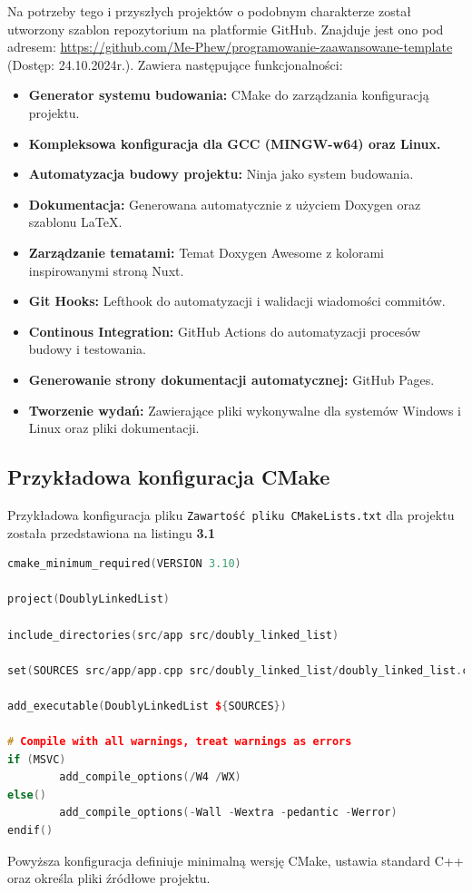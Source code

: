 Na potrzeby tego i przyszłych projektów o podobnym charakterze
został utworzony szablon repozytorium na platformie GitHub.
Znajduje jest ono pod adresem: \url{https://github.com/Me-Phew/programowanie-zaawansowane-template}\cite{GitHubProjectTemplate} (Dostęp: 24.10.2024r.).
Zawiera następujące funkcjonalności:

\begin{itemize}
  \item \textbf{Generator systemu budowania:} CMake do zarządzania konfiguracją projektu.
  \item \textbf{Kompleksowa konfiguracja dla GCC (MINGW-w64) oraz Linux.}
  \item \textbf{Automatyzacja budowy projektu:} Ninja jako system budowania.
  \item \textbf{Dokumentacja:} Generowana automatycznie z użyciem Doxygen oraz szablonu LaTeX.
  \item \textbf{Zarządzanie tematami:} Temat Doxygen Awesome z kolorami inspirowanymi stroną Nuxt.
  \item \textbf{Git Hooks:} Lefthook do automatyzacji i walidacji wiadomości commitów.
  \item \textbf{Continous Integration:} GitHub Actions do automatyzacji procesów budowy i testowania.
  \item \textbf{Generowanie strony dokumentacji automatycznej:} GitHub Pages.
  \item \textbf{Tworzenie wydań:} Zawierające pliki wykonywalne dla systemów Windows i Linux oraz pliki dokumentacji.
\end{itemize}

\newpage

\subsection{Przykładowa konfiguracja CMake}

Przykładowa konfiguracja pliku \texttt{Zawartość pliku CMakeLists.txt} dla projektu została przedstawiona
na listingu \textbf{3.1}

\begin{lstlisting}[caption=CMakeLists.txt, label={lst:listing-CMakeLists.txt}, language=C++]
cmake_minimum_required(VERSION 3.10)

project(DoublyLinkedList)

include_directories(src/app src/doubly_linked_list)

set(SOURCES src/app/app.cpp src/doubly_linked_list/doubly_linked_list.cpp src/main.cpp)

add_executable(DoublyLinkedList ${SOURCES})

# Compile with all warnings, treat warnings as errors
if (MSVC)
		add_compile_options(/W4 /WX)
else()
		add_compile_options(-Wall -Wextra -pedantic -Werror)
endif()
\end{lstlisting}

Powyższa konfiguracja definiuje minimalną wersję CMake, ustawia standard C++ oraz określa pliki źródłowe projektu.
